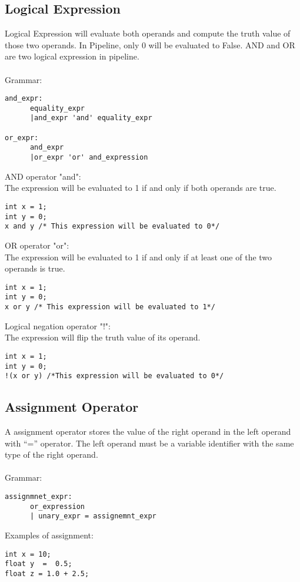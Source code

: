 \documentclass[./LRM_main.tex]{subfiles}
\begin{document}
\subsection{Logical Expression}
Logical Expression will evaluate both operands and compute the truth value of those two operands. In Pipeline, only 0 will be evaluated to False. AND and OR are two logical expression in pipeline.\\
\vspace{1 mm}\\
Grammar:
\begin{lstlisting}
and_expr:
      equality_expr
      |and_expr 'and' equality_expr

or_expr:
      and_expr
      |or_expr 'or' and_expression

\end{lstlisting}
AND operator "and":\\
The expression will be evaluated to 1 if and only if both operands are true.
\begin{lstlisting}
int x = 1;
int y = 0;
x and y /* This expression will be evaluated to 0*/
\end{lstlisting}
OR operator "or":\\
The expression will be evaluated to 1 if and only if at least one of the two operands is true.
\begin{lstlisting}
int x = 1;
int y = 0;
x or y /* This expression will be evaluated to 1*/
\end{lstlisting}
Logical negation operator "!":\\
The expression will flip the truth value of its operand.
\begin{lstlisting}
int x = 1;
int y = 0;
!(x or y) /*This expression will be evaluated to 0*/
\end{lstlisting}
\subsection{Assignment Operator}
A assignment operator stores the value of the right operand in the left operand with “=” operator. The left operand must be a variable identifier with the same type of the right operand.\\
\vspace{1 mm}\\
Grammar:
\begin{lstlisting}
assignmnet_expr:
      or_expression
      | unary_expr = assignemnt_expr

\end{lstlisting}
\vspace{1 mm}
Examples of assignment:
\begin{lstlisting}
int x = 10; 
float y  =  0.5;  
float z = 1.0 + 2.5;
\end{lstlisting}	
\end{document}
